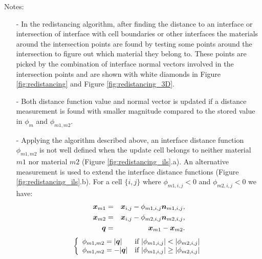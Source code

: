\documentclass[]{article}
\newcommand{\tn}{\textnormal}
\newcommand{\bmq}{\mbox{\boldmath $q$\unboldmath}}
\newcommand{\bmx}{\mbox{\boldmath $x$\unboldmath}}
\newcommand{\bmn}{\mbox{\boldmath $n$\unboldmath}}
\begin{document}
Notes:
\begin{itemize}
\item[-] In the redistancing algorithm, 
  after finding the distance to an interface or intersection of 
  interface with cell boundaries or other interfaces the 
  materials around the intersection points are found by 
  testing some points around the intersection to figure out 
  which material they belong to. These points are 
  picked by the combination of interface normal vectors 
  involved in the intersection points and are shown with white 
  diamonds in Figure \ref{fig:redistancing} and 
  Figure \ref{fig:redistancing_3D}.
\item[-] Both distance function value and normal vector is 
 updated if a distance measurement is found with smaller 
 magnitude compared to the stored value in $\phi_{m}$ and $\phi_{m1,m2}$.
\item[-] Applying the algorithm described above, an interface 
 distance function $\phi_{m1,m2}$ is not well defined when the 
 update cell belongs to neither material $m1$ nor 
 material $m2$ (Figure \ref{fig:redistancing_ils}.a). 
 An alternative measurement is used to extend the 
 interface distance functions (Figure \ref{fig:redistancing_ils}.b). 
 For a cell $\{i,j\}$ where $\phi_{m1,i,j}<0$ and $\phi_{m2,i,j}<0$ we have:
  \begin{eqnarray}
    \bmx_{m1} &=& \bmx_{i,j} - \phi_{m1,i,j} \bmn_{m1,i,j}, \\
    \bmx_{m2} &=& \bmx_{i,j} - \phi_{m2,i,j} \bmn_{m2,i,j}, \\
    \bmq &=& \bmx_{m1} - \bmx_{m2}.
  \end{eqnarray}
  \begin{equation}
    \left\{
      \begin{array}{lll}
        \phi_{m1,m2} = |\bmq|  &\tn{if } |\phi_{m1,i,j}| < |\phi_{m2,i,j}| \\
        \phi_{m1,m2} = -|\bmq| &\tn{if } |\phi_{m1,i,j}| \ge |\phi_{m2,i,j}| \\
      \end{array}
    \right.
  \end{equation}
\end{itemize}
 
\end{document}
